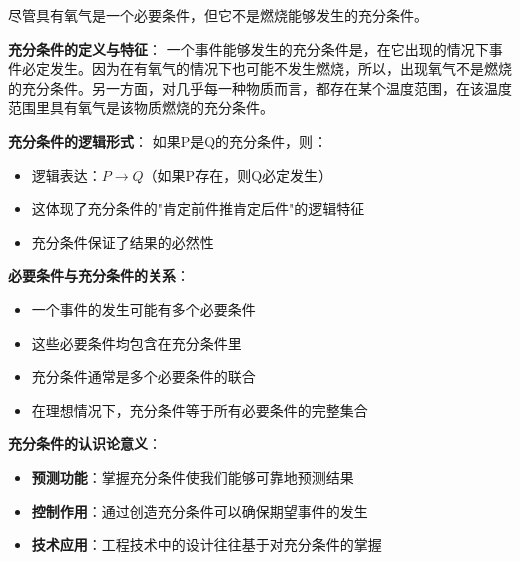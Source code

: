 \begin{theorembox}[title=充分条件的深入分析]
尽管具有氧气是一个必要条件，但它不是燃烧能够发生的充分条件。

\textbf{充分条件的定义与特征}：
一个事件能够发生的充分条件是，在它出现的情况下事件必定发生。因为在有氧气的情况下也可能不发生燃烧，所以，出现氧气不是燃烧的充分条件。另一方面，对几乎每一种物质而言，都存在某个温度范围，在该温度范围里具有氧气是该物质燃烧的充分条件。

\textbf{充分条件的逻辑形式}：
如果P是Q的充分条件，则：
\begin{itemize}
\item 逻辑表达：$P \rightarrow Q$（如果P存在，则Q必定发生）
\item 这体现了充分条件的"肯定前件推肯定后件"的逻辑特征
\item 充分条件保证了结果的必然性
\end{itemize}

\textbf{必要条件与充分条件的关系}：
\begin{itemize}
\item 一个事件的发生可能有多个必要条件
\item 这些必要条件均包含在充分条件里
\item 充分条件通常是多个必要条件的联合
\item 在理想情况下，充分条件等于所有必要条件的完整集合
\end{itemize}

\textbf{充分条件的认识论意义}：
\begin{itemize}
\item \textbf{预测功能}：掌握充分条件使我们能够可靠地预测结果
\item \textbf{控制作用}：通过创造充分条件可以确保期望事件的发生
\item \textbf{技术应用}：工程技术中的设计往往基于对充分条件的掌握
\end{itemize}
\end{theorembox}

